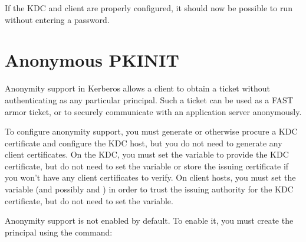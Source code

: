 \documentclass[letterpaper,10pt,english]{sphinxmanual}
\begin{document}
%
\begin{sphinxVerbatim}[commandchars=\\\{\}]
  
\end{sphinxVerbatim}

If the KDC and client are properly configured, it should now be
possible to run  without entering a password.


\section{Anonymous PKINIT}
\label{\detokenize{admin/pkinit:anonymous-pkinit}}\label{\detokenize{admin/pkinit:id1}}
Anonymity support in Kerberos allows a client to obtain a ticket
without authenticating as any particular principal.  Such a ticket can
be used as a FAST armor ticket, or to securely communicate with an
application server anonymously.

To configure anonymity support, you must generate or otherwise procure
a KDC certificate and configure the KDC host, but you do not need to
generate any client certificates.  On the KDC, you must set the
 variable to provide the KDC certificate, but do
not need to set the  variable or store the issuing
certificate if you won’t have any client certificates to verify.  On
client hosts, you must set the  variable (and
possibly  and ) in order
to trust the issuing authority for the KDC certificate, but do not
need to set the  variable.

Anonymity support is not enabled by default.  To enable it, you must
create the principal  using the command:

%
\begin{sphinxVerbatim}[commandchars=\\\{\}]
  
\end{sphinxVerbatim}
\end{document}
